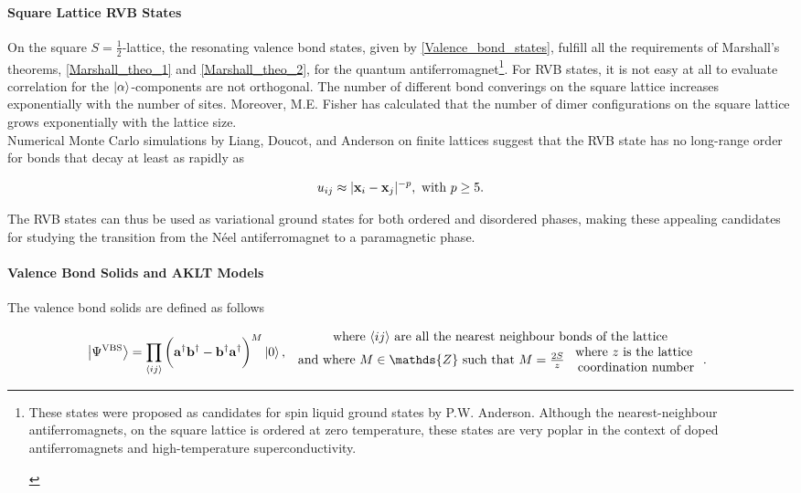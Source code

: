 \documentclass{homework}
\begin{document}
\paragraph{Square Lattice RVB States}

On the square $S=\frac{1}{2}$-lattice, the resonating valence bond states, given by \cref{Valence_bond_states}, fulfill all the requirements of Marshall's theorems,  \cref{Marshall_theo_1} and \cref{Marshall_theo_2}, for the quantum antiferromagnet\footnote{\begin{tcolorbox}[colback=LimeGreen, title = Historical Context]

These states were proposed as candidates for spin liquid ground states by P.W. Anderson. Although the nearest-neighbour antiferromagnets, on the square lattice is ordered at zero temperature, these states are very poplar in the context of doped antiferromagnets and high-temperature superconductivity. 

\end{tcolorbox}}. For RVB states, it is not easy at all to evaluate correlation for the $\ket{\alpha}$-components are not orthogonal. The number of different bond converings on the square lattice increases exponentially with the number of sites. Moreover, M.E. Fisher has calculated that the number of dimer configurations on the square lattice grows exponentially with the lattice size. \\

Numerical Monte Carlo simulations by Liang, Doucot, and Anderson on finite lattices suggest that the RVB state has no long-range order for bonds that decay at least as rapidly as 

$$
    u_{ij} \approx |{\bf x}_i - {\bf x}_j|^{-p}, \textnormal{ with } p \geq 5.
$$

The RVB states can thus be used as variational ground states for both ordered and disordered phases, making these appealing candidates for studying the transition from the Néel antiferromagnet to a paramagnetic phase. \\

\paragraph{Valence Bond Solids and AKLT Models}

The valence bond solids are defined as follows 

\begin{equation}
\ket{\Psi^{\textnormal{VBS}}} = \prod_{\langle ij \rangle} \bigg({\bf a}^\dagger {\bf b}^\dagger - {\bf b}^\dagger {\bf a}^\dagger\bigg)^M \ket{0}, \begin{array}{c}
     \textnormal{where $\langle ij \rangle$ are all the nearest neighbour bonds of the lattice} \\
     \textnormal{ and where $M \in \mathds{Z}$ such that } M  =\frac{2S}{z} \begin{array}{cc}
          \textnormal{ where $z$ is the lattice }  \\
          \textnormal{ coordination number}
     \end{array}.
     \label{valence_bond_solids}
\end{array}
\end{equation}
\end{document}
